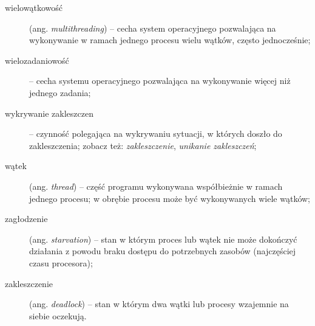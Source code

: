 \documentclass[11pt]{article}
\begin{document}
\begin{description}
    \item[wielowątkowość] (ang. \emph{multithreading}) -- cecha system operacyjnego pozwalająca na wykonywanie w ramach jednego procesu wielu wątków, często jednocześnie;
    \item[wielozadaniowość] -- cecha systemu operacyjnego pozwalająca na wykonywanie więcej niż jednego zadania;
    \item[wykrywanie zakleszczen] -- czynność polegająca na wykrywaniu sytuacji, w których doszło do zakleszczenia; zobacz też: \emph{zakleszczenie}, \emph{unikanie zakleszczeń};
    \item[wątek] (ang. \emph{thread}) -- część programu wykonywana współbieżnie w ramach jednego procesu; w obrębie procesu może być wykonywanych wiele wątków;
    \item[zagłodzenie] (ang. \emph{starvation}) -- stan w którym proces lub wątek nie może dokończyć działania z powodu braku dostępu do potrzebnych zasobów (najczęściej czasu procesora);
    \item[zakleszczenie] (ang. \emph{deadlock}) -- stan w którym dwa wątki lub procesy wzajemnie na siebie oczekują.
\end{description}
\end{document}
